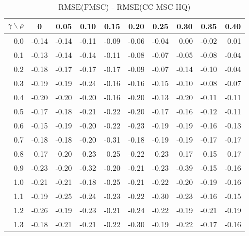 \documentclass[12pt]{article}
\begin{document}
\begin{table}[!tbp]
\caption{RMSE(FMSC) - RMSE(CC-MSC-HQ)}
 \begin{center}
 \begin{tabular}{r|rrrrrrrrr}\hline\hline
\multicolumn{1}{c|}{$\gamma\backslash\rho$}&\multicolumn{1}{c}{0}&\multicolumn{1}{c}{0.05}&\multicolumn{1}{c}{0.10}&\multicolumn{1}{c}{0.15}&\multicolumn{1}{c}{0.20}&\multicolumn{1}{c}{0.25}&\multicolumn{1}{c}{0.30}&\multicolumn{1}{c}{0.35}&\multicolumn{1}{c}{0.40}\tabularnewline
\hline

0.0&-0.14&-0.14&-0.11&-0.09&-0.06&-0.04& 0.00&-0.02& 0.01\tabularnewline
0.1&-0.13&-0.14&-0.14&-0.11&-0.08&-0.07&-0.05&-0.08&-0.04\tabularnewline
0.2&-0.18&-0.17&-0.17&-0.17&-0.09&-0.07&-0.14&-0.10&-0.04\tabularnewline
0.3&-0.19&-0.19&-0.24&-0.16&-0.16&-0.15&-0.10&-0.08&-0.07\tabularnewline
0.4&-0.20&-0.20&-0.20&-0.16&-0.20&-0.13&-0.20&-0.11&-0.11\tabularnewline
0.5&-0.17&-0.18&-0.21&-0.22&-0.20&-0.17&-0.16&-0.12&-0.11\tabularnewline
0.6&-0.15&-0.19&-0.20&-0.22&-0.23&-0.19&-0.19&-0.16&-0.13\tabularnewline
0.7&-0.18&-0.18&-0.20&-0.31&-0.18&-0.19&-0.19&-0.17&-0.17\tabularnewline
0.8&-0.17&-0.20&-0.23&-0.25&-0.22&-0.23&-0.17&-0.15&-0.17\tabularnewline
0.9&-0.23&-0.20&-0.32&-0.20&-0.21&-0.23&-0.39&-0.15&-0.16\tabularnewline
1.0&-0.21&-0.21&-0.18&-0.25&-0.21&-0.22&-0.20&-0.19&-0.16\tabularnewline
1.1&-0.19&-0.25&-0.24&-0.23&-0.22&-0.30&-0.23&-0.16&-0.15\tabularnewline
1.2&-0.26&-0.19&-0.23&-0.21&-0.24&-0.22&-0.19&-0.21&-0.19\tabularnewline
1.3&-0.18&-0.21&-0.21&-0.22&-0.30&-0.19&-0.22&-0.17&-0.16\tabularnewline
\hline
\end{tabular}

\end{center}

\end{table}
\end{document}
